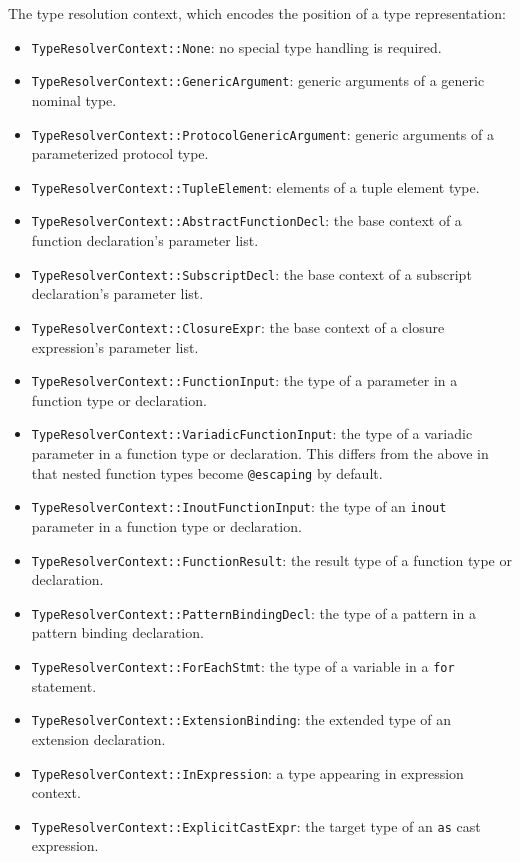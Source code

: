 \documentclass[../generics]{subfiles}
\begin{document}
The type resolution context, which encodes the position of a type representation:
\begin{itemize}
\item \texttt{TypeResolverContext::None}: no special type handling is required.
\item \texttt{TypeResolverContext::GenericArgument}: generic arguments of a generic nominal type.
\item \texttt{TypeResolverContext::ProtocolGenericArgument}: generic arguments of a parameterized protocol type.
\item \texttt{TypeResolverContext::TupleElement}: elements of a tuple element type.
\item \texttt{TypeResolverContext::AbstractFunctionDecl}: the base context of a function declaration's parameter list.
\item \texttt{TypeResolverContext::SubscriptDecl}: the base context of a subscript declaration's parameter list.
\item \texttt{TypeResolverContext::ClosureExpr}: the base context of a closure expression's parameter list.
\item \texttt{TypeResolverContext::FunctionInput}: the type of a parameter in a function type or declaration.
\item \texttt{TypeResolverContext::VariadicFunctionInput}: the type of a variadic parameter in a function type or declaration. This differs from the above in that nested function types become \texttt{@escaping} by default.
\item \texttt{TypeResolverContext::InoutFunctionInput}: the type of an \texttt{inout} parameter in a function type or declaration.
\item \texttt{TypeResolverContext::FunctionResult}: the result type of a function type or declaration.
\item \texttt{TypeResolverContext::PatternBindingDecl}: the type of a pattern in a pattern binding declaration.
\item \texttt{TypeResolverContext::ForEachStmt}: the type of a variable in a \texttt{for} statement.
\item \texttt{TypeResolverContext::ExtensionBinding}: the extended type of an extension declaration.
\item \texttt{TypeResolverContext::InExpression}: a type appearing in expression context.
\item \texttt{TypeResolverContext::ExplicitCastExpr}: the target type of an \texttt{as} cast expression.

\end{itemize}
\end{document}
